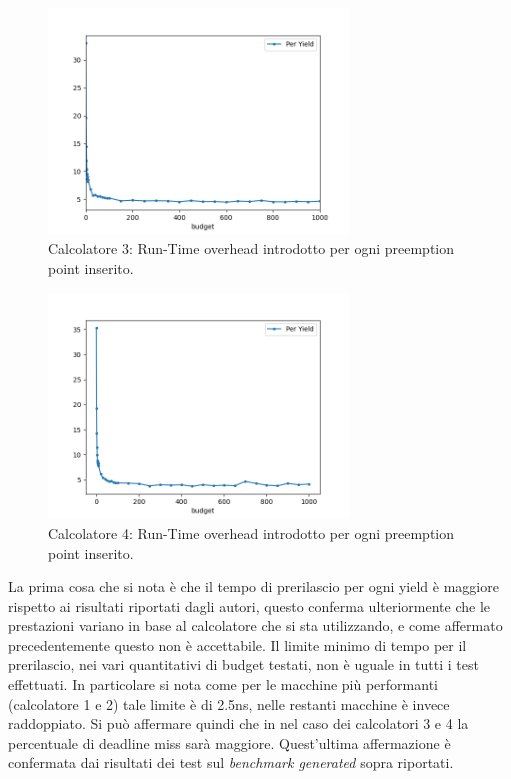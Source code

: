 \documentclass[conference]{IEEEtran}
\begin{document}
    \begin{figure}[hbt!]
    \includegraphics[width=8cm]{micro_3.1.png}
    \centering
    \caption{Calcolatore 3: Run-Time overhead introdotto per ogni preemption point inserito.}
    \end{figure}
    \begin{figure}[hbt!]
    \includegraphics[width=8cm]{micro_4.1.png}
    \centering
    \caption{Calcolatore 4: Run-Time overhead introdotto per ogni preemption point inserito.}
    \end{figure}
    \newpage
    La prima cosa che si nota è che il tempo di prerilascio per ogni yield è maggiore rispetto ai risultati riportati dagli autori, questo conferma ulteriormente che le prestazioni variano in base al calcolatore che si sta utilizzando, e come affermato precedentemente questo non è accettabile.
    \newline
    Il limite minimo di tempo per il prerilascio, nei vari quantitativi di budget testati, non è uguale in tutti i test effettuati. In particolare si nota come per le macchine più performanti (calcolatore 1 e 2) tale limite è di 2.5ns, nelle restanti macchine è invece raddoppiato. Si può affermare quindi che in nel caso dei calcolatori 3 e 4 la percentuale di deadline miss sarà maggiore. Quest'ultima affermazione è confermata dai risultati dei test sul \textit{benchmark generated} sopra riportati.
    
\end{document}
